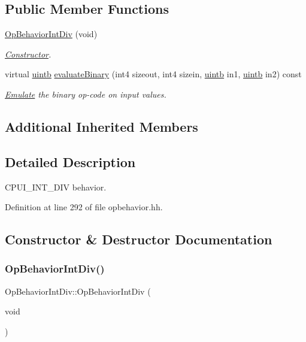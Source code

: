 \subsection*{Public Member Functions}
\begin{DoxyCompactItemize}
\item 
\mbox{\hyperlink{class_op_behavior_int_div_a472ae763ccbf205ec8bc06d49247421a}{Op\+Behavior\+Int\+Div}} (void)
\begin{DoxyCompactList}\small\item\em \mbox{\hyperlink{class_constructor}{Constructor}}. \end{DoxyCompactList}\item 
virtual \mbox{\hyperlink{types_8h_a2db313c5d32a12b01d26ac9b3bca178f}{uintb}} \mbox{\hyperlink{class_op_behavior_int_div_a2e34d9f205b36948c4abc2a2e8faf758}{evaluate\+Binary}} (int4 sizeout, int4 sizein, \mbox{\hyperlink{types_8h_a2db313c5d32a12b01d26ac9b3bca178f}{uintb}} in1, \mbox{\hyperlink{types_8h_a2db313c5d32a12b01d26ac9b3bca178f}{uintb}} in2) const
\begin{DoxyCompactList}\small\item\em \mbox{\hyperlink{class_emulate}{Emulate}} the binary op-\/code on input values. \end{DoxyCompactList}\end{DoxyCompactItemize}
\subsection*{Additional Inherited Members}


\subsection{Detailed Description}
C\+P\+U\+I\+\_\+\+I\+N\+T\+\_\+\+D\+IV behavior. 

Definition at line 292 of file opbehavior.\+hh.



\subsection{Constructor \& Destructor Documentation}
\mbox{\label{class_op_behavior_int_div_a472ae763ccbf205ec8bc06d49247421a}} 
\subsubsection{\texorpdfstring{OpBehaviorIntDiv()}{OpBehaviorIntDiv()}}
{\footnotesize\ttfamily Op\+Behavior\+Int\+Div\+::\+Op\+Behavior\+Int\+Div (\begin{DoxyParamCaption}\item[{void}]{ }\end{DoxyParamCaption})\hspace{0.3cm}{\ttfamily [inline]}}



